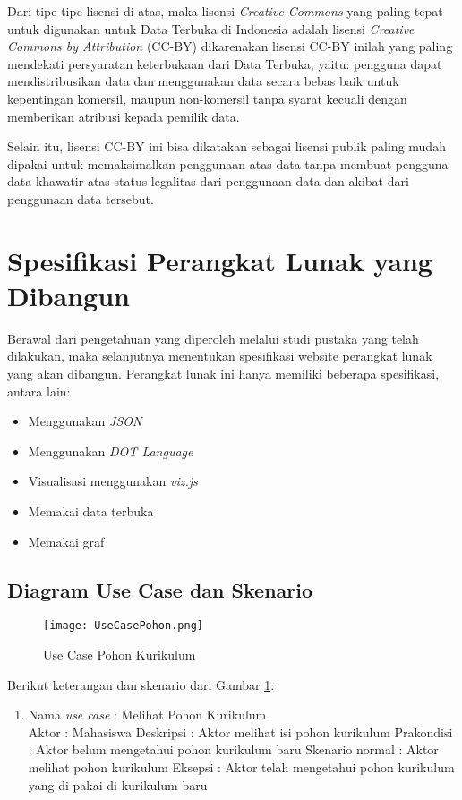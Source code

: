 Dari tipe-tipe lisensi di atas, maka lisensi \textit{Creative Commons} yang paling tepat untuk digunakan untuk Data Terbuka di Indonesia adalah lisensi \textit{Creative Commons by Attribution} (CC-BY) dikarenakan lisensi CC-BY inilah yang paling mendekati persyaratan keterbukaan dari Data Terbuka, yaitu: pengguna dapat mendistribusikan data dan menggunakan data secara bebas baik untuk kepentingan komersil, maupun non-komersil tanpa syarat kecuali dengan memberikan atribusi kepada pemilik data.

Selain itu, lisensi CC-BY ini bisa dikatakan sebagai lisensi publik paling mudah dipakai untuk memaksimalkan penggunaan atas data tanpa membuat pengguna data khawatir atas status legalitas dari penggunaan data dan akibat dari penggunaan data tersebut.

\section{Spesifikasi Perangkat Lunak yang Dibangun}
\label{sec: Spesifikasi Perangkat Lunak yang Dibangun}

Berawal dari pengetahuan yang diperoleh melalui studi pustaka yang telah dilakukan, maka selanjutnya
menentukan spesifikasi website perangkat lunak yang akan dibangun. Perangkat lunak ini hanya
memiliki beberapa spesifikasi, antara lain:
\begin{itemize}
\item Menggunakan \textit{JSON} 
\item Menggunakan \textit{DOT Language}
\item Visualisasi menggunakan \textit{viz.js}
\item Memakai data terbuka
\item Memakai graf
\end{itemize}

\subsection{Diagram Use Case dan Skenario}
\label{sec: Diagram Use Case dan Skenario}

\begin{figure}[H]
		\centering
		\texttt{[image: UseCasePohon.png]}
		\caption{Use Case Pohon Kurikulum}
		\label{fig: Use Case Pohon Kurikulum}
\end{figure}	

Berikut keterangan dan skenario dari Gambar \ref{fig: Use Case Pohon Kurikulum}:
\begin{enumerate}
\item Nama \textit{use case} : Melihat Pohon Kurikulum \\
	  Aktor : Mahasiswa 
	  Deskripsi :  Aktor melihat isi pohon kurikulum 
	  Prakondisi : Aktor belum mengetahui pohon kurikulum baru 
	  Skenario normal : Aktor melihat pohon kurikulum
	  Eksepsi : Aktor telah mengetahui pohon kurikulum yang di pakai di kurikulum baru
	  
\end{enumerate}


